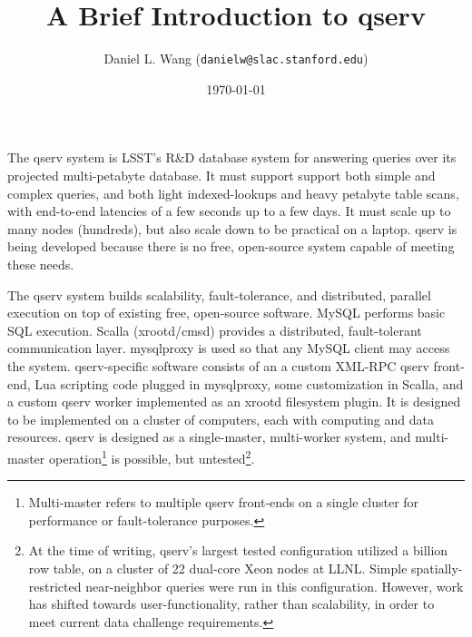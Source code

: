 \documentclass{article}
\title{A Brief Introduction to qserv}
\author{Daniel L. Wang (\texttt{danielw@slac.stanford.edu})}
\date{\today}
\begin{document}
\maketitle

The qserv system is LSST's R\&D database system for answering queries
over its projected multi-petabyte database.  It must support support
both simple and complex queries, and both light indexed-lookups and
heavy petabyte table scans, with end-to-end latencies of a few seconds
up to a few days.  It must scale up to many nodes (hundreds), but also
scale down to be practical on a laptop.  qserv is being developed
because there is no free, 
open-source system capable of meeting these needs.

The qserv system builds scalability, fault-tolerance, and
distributed, parallel execution on top of existing free, open-source
software.  MySQL performs basic SQL execution.  Scalla (xrootd/cmsd)
provides a distributed, fault-tolerant communication layer.
mysqlproxy is used so that any MySQL client may access the system.
qserv-specific software consists of an a custom XML-RPC qserv
front-end, Lua scripting code plugged in mysqlproxy, some
customization in Scalla, and a custom qserv worker implemented as an
xrootd filesystem plugin.  It is designed to be implemented on a
cluster of computers, each with computing and data resources.  qserv
is designed as a single-master, multi-worker system, and multi-master
operation\footnote{Multi-master refers to multiple qserv front-ends on
  a single cluster for performance or fault-tolerance purposes.} is
possible, but untested\footnote{At the time of writing, qserv's
  largest tested configuration utilized a billion row table, on a
  cluster of 22 dual-core Xeon nodes at LLNL.  Simple
  spatially-restricted near-neighbor queries were run in this
  configuration.  However, work has shifted towards
  user-functionality, rather than scalability, in order to meet
  current data challenge requirements. }.
\end{document}

